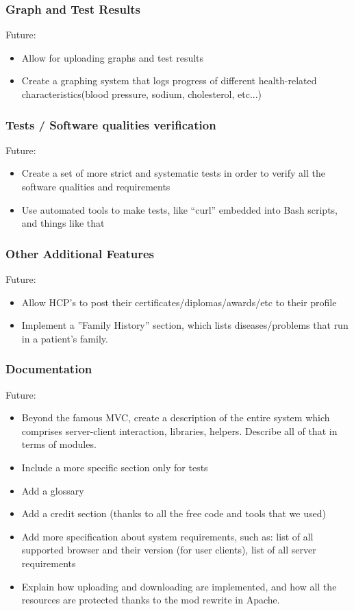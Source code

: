 \subsubsection{Graph and Test Results}
Future: 
\begin{itemize}
\item Allow for uploading graphs and test results
\item Create a graphing system that logs progress of different health-related characteristics(blood pressure, sodium, cholesterol, etc...)
\end{itemize}

\subsubsection{Tests / Software qualities verification}
Future:
\begin{itemize}
\item Create a set of more strict and systematic tests in order to verify all the software qualities and requirements
\item Use automated tools to make tests, like ``curl'' embedded into Bash scripts, and things like that
\end{itemize}

\subsubsection{Other Additional Features}
Future:
\begin{itemize}
\item Allow HCP's to post their certificates/diplomas/awards/etc to their profile
\item Implement a ''Family History'' section, which lists diseases/problems that run in a patient's family. 
\end{itemize}

\subsubsection{Documentation}
Future:
\begin{itemize}
\item Beyond the famous MVC, create a description of the entire system which comprises server-client interaction, libraries, helpers. Describe all of that in terms of modules.
\item Include a more specific section only for tests
\item Add a glossary
\item Add a credit section (thanks to all the free code and tools that we used)
\item Add more specification about system requirements, such as: list of all supported browser and their version (for user clients), list of all server requirements
\item Explain how uploading and downloading are implemented, and how all the resources are protected thanks to the mod rewrite in Apache. 
\end{itemize}
